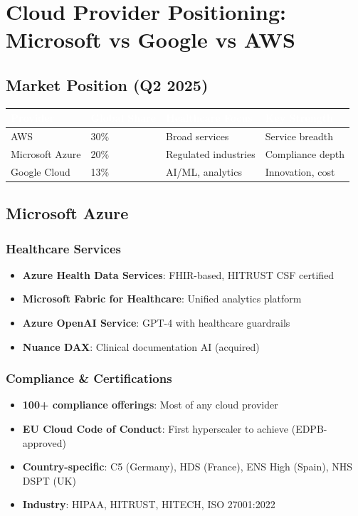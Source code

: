 \documentclass[11pt,a4paper]{article}
\begin{document}
\section{Cloud Provider Positioning: Microsoft vs Google vs AWS}

\subsection{Market Position (Q2 2025)}

\begin{center}
\begin{tabular}{L{3cm}C{2cm}C{2.5cm}C{3cm}}
\toprule
{}
\textcolor{white}{\textbf{Provider}} & \textcolor{white}{\textbf{Global Share}} & \textcolor{white}{\textbf{Healthcare Focus}} & \textcolor{white}{\textbf{Key Strength}} \\
\midrule
AWS & 30\% & Broad services & Service breadth \\
Microsoft Azure & 20\% & Regulated industries & Compliance depth \\
Google Cloud & 13\% & AI/ML, analytics & Innovation, cost \\
\bottomrule
\end{tabular}
\end{center}

\subsection{Microsoft Azure}

\subsubsection{Healthcare Services}
\begin{itemize}
    \item \textbf{Azure Health Data Services}: FHIR-based, HITRUST CSF certified
    \item \textbf{Microsoft Fabric for Healthcare}: Unified analytics platform
    \item \textbf{Azure OpenAI Service}: GPT-4 with healthcare guardrails
    \item \textbf{Nuance DAX}: Clinical documentation AI (acquired)
\end{itemize}

\subsubsection{Compliance \& Certifications}
\begin{itemize}
    \item \textbf{100+ compliance offerings}: Most of any cloud provider
    \item \textbf{EU Cloud Code of Conduct}: First hyperscaler to achieve (EDPB-approved)
    \item \textbf{Country-specific}: C5 (Germany), HDS (France), ENS High (Spain), NHS DSPT (UK)
    \item \textbf{Industry}: HIPAA, HITRUST, HITECH, ISO 27001:2022
\end{itemize}
\end{document}
